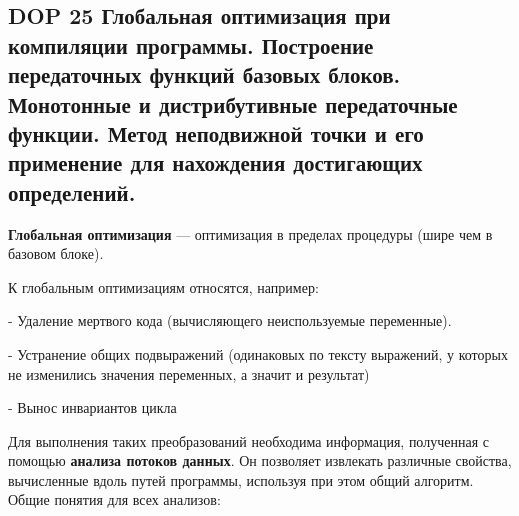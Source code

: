\subsection{DOP 25 Глобальная оптимизация при компиляции программы. Построение передаточных функций базовых блоков. Монотонные и дистрибутивные передаточные функции. Метод неподвижной точки и его применение для нахождения достигающих определений.}

\textbf{Глобальная оптимизация} --- оптимизация в пределах процедуры (шире чем в базовом блоке).

К глобальным оптимизациям относятся, например:

- Удаление мертвого кода (вычисляющего неиспользуемые переменные).

- Устранение общих подвыражений (одинаковых по тексту выражений, у которых не изменились значения переменных, а значит и результат)

- Вынос инвариантов цикла


Для выполнения таких преобразований необходима информация, полученная с помощью \textbf{анализа потоков данных}. Он позволяет извлекать различные свойства, вычисленные вдоль путей программы, используя при этом общий алгоритм. Общие понятия для всех анализов:

